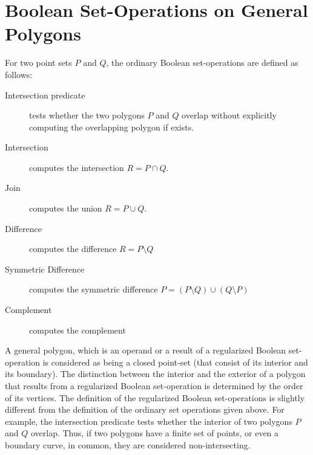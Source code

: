 \section{Boolean Set-Operations on General Polygons}
\label{bobs_sec:bops}
For two point sets $P$ and $Q$, the ordinary Boolean set-operations are
defined as follows:
\begin{description}
\item [Intersection predicate] tests whether the two polygons $P$ and $Q$
  overlap without explicitly computing the overlapping polygon if exists.
\item[Intersection] computes the intersection $R = P \cap Q$.
\item[Join] computes the union $R = P \cup Q$.
\item [Difference] computes the difference $R = P \setminus Q$ 
\item [Symmetric Difference] computes the symmetric difference
  $P = (P \setminus Q) \cup (Q \setminus P)$
\item[Complement] computes the complement
\end{description}

A general polygon, which is an operand or a result of a regularized
Boolean set-operation is considered as being a closed point-set (that
consist of its interior and its boundary). The distinction between the 
interior and  the exterior of a polygon that results from a regularized 
Boolean set-operation is determined by the order of its vertices. 
The definition of the regularized Boolean set-operations 
is slightly different from the definition of the ordinary set operations
given above. For example, the intersection predicate tests whether the 
interior of two polygons $P$ and $Q$ overlap. Thus, if two polygons have 
a finite set of points, or even a boundary curve, in common, they are 
considered non-intersecting.

